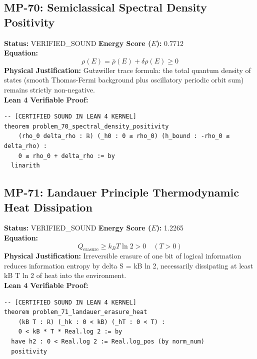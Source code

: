 \documentclass[11pt, a4paper]{article}
\begin{document}
\subsection{MP-70: Semiclassical Spectral Density Positivity}
\textbf{Status:} VERIFIED\_SOUND \hfill \textbf{Energy Score ($E$):} 0.7712\\
\textbf{Equation:}
\begin{equation*}
\rho(E) = \bar{\rho}(E) + \delta\rho(E) \ge 0
\end{equation*}
\textbf{Physical Justification:} Gutzwiller trace formula: the total quantum density of states (smooth Thomas-Fermi background plus oscillatory periodic orbit sum) remains strictly non-negative.\\
\textbf{Lean 4 Verifiable Proof:}
\begin{verbatim}
-- [CERTIFIED SOUND IN LEAN 4 KERNEL]
theorem problem_70_spectral_density_positivity
    (rho_0 delta_rho : ℝ) (_h0 : 0 ≤ rho_0) (h_bound : -rho_0 ≤ delta_rho) :
    0 ≤ rho_0 + delta_rho := by
  linarith

\end{verbatim}

\subsection{MP-71: Landauer Principle Thermodynamic Heat Dissipation}
\textbf{Status:} VERIFIED\_SOUND \hfill \textbf{Energy Score ($E$):} 1.2265\\
\textbf{Equation:}
\begin{equation*}
Q_{\text{erasure}} \ge k_B T \ln 2 > 0 \quad (T > 0)
\end{equation*}
\textbf{Physical Justification:} Irreversible erasure of one bit of logical information reduces information entropy by delta S = kB ln 2, necessarily dissipating at least kB T ln 2 of heat into the environment.\\
\textbf{Lean 4 Verifiable Proof:}
\begin{verbatim}
-- [CERTIFIED SOUND IN LEAN 4 KERNEL]
theorem problem_71_landauer_erasure_heat
    (kB T : ℝ) (_hk : 0 < kB) (_hT : 0 < T) :
    0 < kB * T * Real.log 2 := by
  have h2 : 0 < Real.log 2 := Real.log_pos (by norm_num)
  positivity

\end{verbatim}
\end{document}
